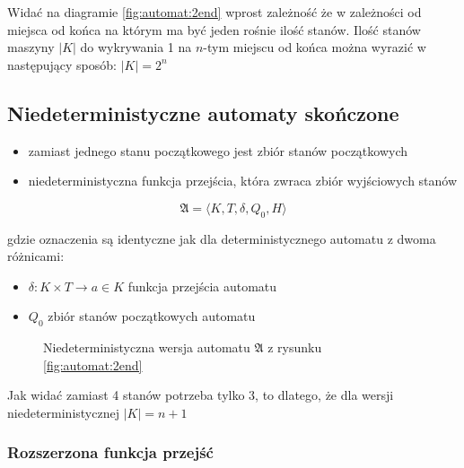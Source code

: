 \documentclass{../notatki}
\begin{document}
Widać na diagramie \ref{fig:automat:2end} wprost zależność że w zależności od miejsca od końca na którym ma być jeden rośnie ilość stanów.
Ilość stanów maszyny $|K|$ do wykrywania 1 na $n$-tym miejscu od końca można wyrazić w następujący sposób: $|K| = 2^n$ 

\subsection{Niedeterministyczne automaty skończone}

\begin{itemize}
    \item zamiast jednego stanu początkowego jest zbiór stanów początkowych
    \item niedeterministyczna funkcja przejścia, która zwraca zbiór wyjściowych stanów
\end{itemize}

$$
\mathfrak{A} = \langle K,T,\delta,Q_0,H \rangle 
$$

gdzie oznaczenia są identyczne jak dla deterministycznego automatu z dwoma różnicami:

\begin{itemize}
    \item $\delta: K \times T \rightarrow a \in K$  funkcja przejścia automatu
    \item $Q_0$ zbiór stanów początkowych automatu
\end{itemize}

\begin{figure}[h!]
    \centering
    \caption{Niedeterministyczna wersja automatu $\mathfrak{A}$ z rysunku \ref{fig:automat:2end}}
    \label{fig:automat:2end-ndet}
\end{figure}

Jak widać zamiast 4 stanów potrzeba tylko 3, to dlatego, że dla wersji niedeterministycznej $|K| = n + 1$

\subsubsection{Rozszerzona funkcja przejść}
\end{document}
